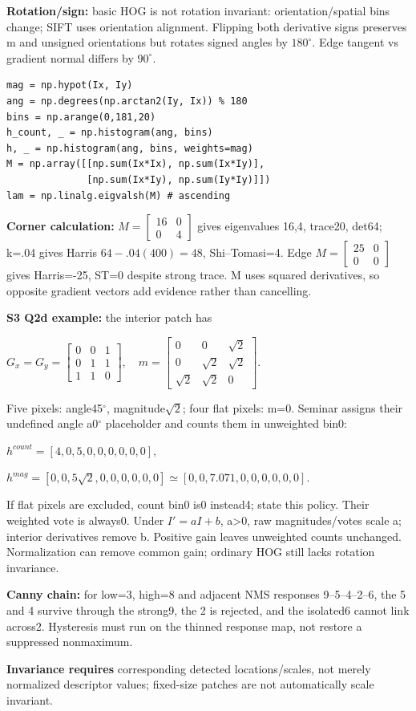 \documentclass[a4paper]{article}
\newcommand{\key}[1]{\textbf{#1}}
\newcommand{\eq}[1]{\par\noindent\mbox{\(\displaystyle #1\)}\par}
\newcommand{\smat}[1]{\left[\begin{smallmatrix}#1\end{smallmatrix}\right]}
\newcounter{sheet}
\newcounter{sheetcolumn}
\newlength{\colwidth}
\newenvironment{sheetcol}[1][7.0]{\stepcounter{sheetcolumn}
  \begin{lrbox}{\columnbox}\begin{minipage}[t]{\colwidth}\vspace{0pt}
  \fontsize{#1}{\dimexpr#1pt+0.6pt\relax}\selectfont}
  {\end{minipage}\end{lrbox}
  \typeout{CV1COL|\thesheet|\thesheetcolumn|\the\dimexpr\ht\columnbox+\dp\columnbox\relax}
  \usebox{\columnbox}\ignorespacesafterend}
\newcommand{\Sep}{\hfill}
\begin{document}
\begin{sheetcol}[6.6]
\key{Rotation/sign:} basic HOG is not rotation invariant: orientation/spatial bins change; SIFT uses orientation alignment. Flipping both derivative signs preserves m and unsigned orientations but rotates signed angles by \(180^\circ\). Edge tangent vs gradient normal differs by \(90^\circ\).
\begin{lstlisting}
mag = np.hypot(Ix, Iy)
ang = np.degrees(np.arctan2(Iy, Ix)) % 180
bins = np.arange(0,181,20)
h_count, _ = np.histogram(ang, bins)
h, _ = np.histogram(ang, bins, weights=mag)
M = np.array([[np.sum(Ix*Ix), np.sum(Ix*Iy)],
              [np.sum(Ix*Iy), np.sum(Iy*Iy)]])
lam = np.linalg.eigvalsh(M) # ascending
\end{lstlisting}
\key{Corner calculation:} \(M=\smat{16&0\\0&4}\) gives eigenvalues 16,4, trace20, det64; k=.04 gives Harris \(64-.04(400)=48\), Shi--Tomasi=4. Edge \(M=\smat{25&0\\0&0}\) gives Harris=-25, ST=0 despite strong trace. M uses squared derivatives, so opposite gradient vectors add evidence rather than cancelling.

\key{S3 Q2d example:} the interior patch has
\eq{G_x=G_y=\smat{0&0&1\\0&1&1\\1&1&0},\quad
m=\smat{0&0&\sqrt2\\0&\sqrt2&\sqrt2\\\sqrt2&\sqrt2&0}.}
Five pixels: angle45\(^{\circ}\), magnitude\(\sqrt2\); four flat pixels: m=0. Seminar assigns their undefined angle a0\(^{\circ}\) placeholder and counts them in unweighted bin0:
\eq{h^{count}=[4,0,5,0,0,0,0,0,0],}
\eq{h^{mag}=[0,0,5\sqrt2,0,0,0,0,0,0]\simeq[0,0,7.071,0,0,0,0,0,0].}
If flat pixels are excluded, count bin0 is0 instead4; state this policy. Their weighted vote is always0. Under \(I'=aI+b\), a>0, raw magnitudes/votes scale a; interior derivatives remove b. Positive gain leaves unweighted counts unchanged. Normalization can remove common gain; ordinary HOG still lacks rotation invariance.

\key{Canny chain:} for low=3, high=8 and adjacent NMS responses 9--5--4--2--6, the 5 and 4 survive through the strong9, the 2 is rejected, and the isolated6 cannot link across2. Hysteresis must run on the thinned response map, not restore a suppressed nonmaximum.

\key{Invariance requires} corresponding detected locations/scales, not merely normalized descriptor values; fixed-size patches are not automatically scale invariant.
\end{sheetcol}\Sep
\end{document}
